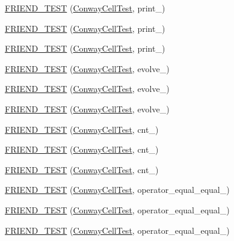 \begin{DoxyCompactItemize}
\item 
\hyperlink{classConwayCell_a2bb98a624065715ba41f16d10b6e9940}{F\-R\-I\-E\-N\-D\-\_\-\-T\-E\-S\-T} (\hyperlink{classConwayCell_aaf9203db9ae10bf69d131c17aa7bf43c}{Conway\-Cell\-Test}, print\-\_)
\item 
\hyperlink{classConwayCell_a7242e24d1d1ef00e33e4c7a1c086402d}{F\-R\-I\-E\-N\-D\-\_\-\-T\-E\-S\-T} (\hyperlink{classConwayCell_aaf9203db9ae10bf69d131c17aa7bf43c}{Conway\-Cell\-Test}, print\-\_)
\item 
\hyperlink{classConwayCell_aee2276a5977cdc6d699ac17461a3e695}{F\-R\-I\-E\-N\-D\-\_\-\-T\-E\-S\-T} (\hyperlink{classConwayCell_aaf9203db9ae10bf69d131c17aa7bf43c}{Conway\-Cell\-Test}, print\-\_)
\item 
\hyperlink{classConwayCell_a5ec1d3543e64c91e7f5a4c102de94bd6}{F\-R\-I\-E\-N\-D\-\_\-\-T\-E\-S\-T} (\hyperlink{classConwayCell_aaf9203db9ae10bf69d131c17aa7bf43c}{Conway\-Cell\-Test}, evolve\-\_)
\item 
\hyperlink{classConwayCell_a5c8705818153b330a7ec627abe35d1e2}{F\-R\-I\-E\-N\-D\-\_\-\-T\-E\-S\-T} (\hyperlink{classConwayCell_aaf9203db9ae10bf69d131c17aa7bf43c}{Conway\-Cell\-Test}, evolve\-\_)
\item 
\hyperlink{classConwayCell_afe554afb102b15f42819bc5021d80dae}{F\-R\-I\-E\-N\-D\-\_\-\-T\-E\-S\-T} (\hyperlink{classConwayCell_aaf9203db9ae10bf69d131c17aa7bf43c}{Conway\-Cell\-Test}, evolve\-\_)
\item 
\hyperlink{classConwayCell_acff342e1a23dad421d012916272d51f4}{F\-R\-I\-E\-N\-D\-\_\-\-T\-E\-S\-T} (\hyperlink{classConwayCell_aaf9203db9ae10bf69d131c17aa7bf43c}{Conway\-Cell\-Test}, cnt\-\_)
\item 
\hyperlink{classConwayCell_add103ae6493c6aab58eeb8549c9c6aba}{F\-R\-I\-E\-N\-D\-\_\-\-T\-E\-S\-T} (\hyperlink{classConwayCell_aaf9203db9ae10bf69d131c17aa7bf43c}{Conway\-Cell\-Test}, cnt\-\_)
\item 
\hyperlink{classConwayCell_a5cb196006329cfa5bb92b682297bddfa}{F\-R\-I\-E\-N\-D\-\_\-\-T\-E\-S\-T} (\hyperlink{classConwayCell_aaf9203db9ae10bf69d131c17aa7bf43c}{Conway\-Cell\-Test}, cnt\-\_)
\item 
\hyperlink{classConwayCell_a5bb511ca635edd0de76fc7d7603b9617}{F\-R\-I\-E\-N\-D\-\_\-\-T\-E\-S\-T} (\hyperlink{classConwayCell_aaf9203db9ae10bf69d131c17aa7bf43c}{Conway\-Cell\-Test}, operator\-\_\-equal\-\_\-equal\-\_)
\item 
\hyperlink{classConwayCell_abd78212cc3404f77b5a08f0686c190bd}{F\-R\-I\-E\-N\-D\-\_\-\-T\-E\-S\-T} (\hyperlink{classConwayCell_aaf9203db9ae10bf69d131c17aa7bf43c}{Conway\-Cell\-Test}, operator\-\_\-equal\-\_\-equal\-\_)
\item 
\hyperlink{classConwayCell_a46f5c85b64001dedaaa8d859be53ebcf}{F\-R\-I\-E\-N\-D\-\_\-\-T\-E\-S\-T} (\hyperlink{classConwayCell_aaf9203db9ae10bf69d131c17aa7bf43c}{Conway\-Cell\-Test}, operator\-\_\-equal\-\_\-equal\-\_)
\end{DoxyCompactItemize}
